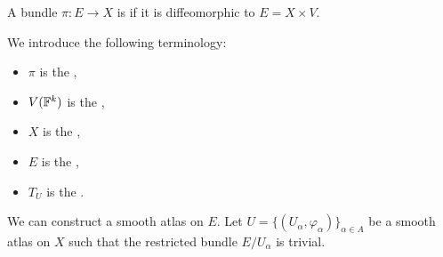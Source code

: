 \begin{definition}
  A bundle $\pi: E \to X$ is  if it is diffeomorphic to $E = X
  \times V$.
\end{definition}

We introduce the following terminology:
\begin{itemize}
\item $\pi$ is the ,
\item $V(\mathbb{F}^k)$ is the ,
\item $X$ is the ,
\item $E$ is the ,
\item $T_U$ is the .
\end{itemize}

We can construct a smooth atlas on $E$.
Let $U = \{ (U_\alpha, \varphi_\alpha) \}_{\alpha \in A}$ be a smooth atlas on
$X$ such that the restricted bundle $E/U_\alpha$ is trivial.

